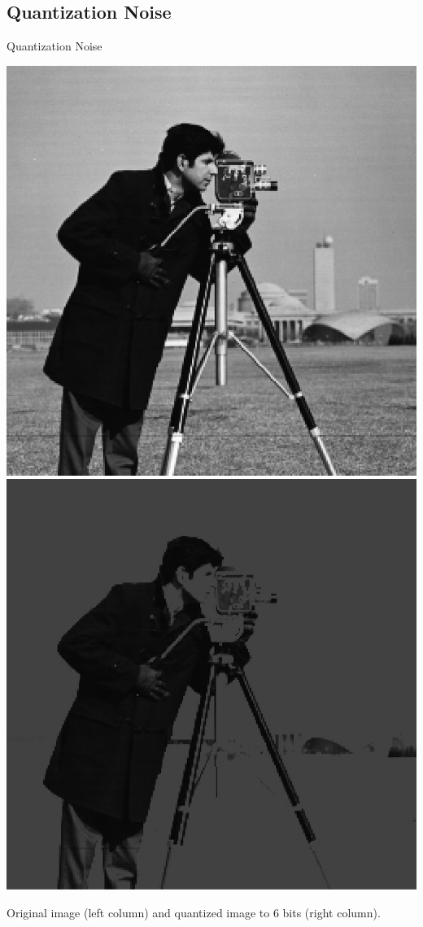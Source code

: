 \documentclass{beamer}
\begin{document}
\subsection{Quantization Noise}
\begin{frame}{Quantization Noise}

\vspace{1cm}
\begin{center}
	  \includegraphics[width=0.4\columnwidth]{images/salt_pepper_origin.jpg}
	    \includegraphics[width=0.4\columnwidth]{images/quantization_noise.jpg}
		
		Original image (left column) and quantized image to 6 bits (right column).
	


\end{center}
\end{frame}
\end{document}
